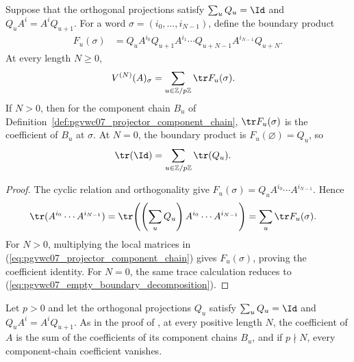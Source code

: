 \begin{lemma}
    \label{thm:pgvwc07_boundary_trace_coefficients}
    \leanok
    Suppose that the orthogonal projections satisfy
    $\sum_uQ_u=\Id$ and $Q_uA^i=A^iQ_{u+1}$. For a word
    $\sigma=(i_0,\ldots,i_{N-1})$, define the boundary product
    \begin{align}
        F_u(\sigma)
         & =Q_uA^{i_0}Q_{u+1}A^{i_1}\cdots
        Q_{u+N-1}A^{i_{N-1}}Q_{u+N}.
        \label{eq:pgvwc07_boundary_product}
    \end{align}
    At every length $N\geq 0$,
    \begin{align}
        V^{(N)}(A)_\sigma
         & =\sum_{u\in\mathbb Z/p\mathbb Z}\tr F_u(\sigma).
        \label{eq:pgvwc07_boundary_coefficient_decomposition}
    \end{align}
    If $N>0$, then for the component chain $B_u$ of
    Definition~\ref{def:pgvwc07_projector_component_chain}, $\tr F_u(\sigma)$
    is the coefficient of $B_u$ at $\sigma$.
    At $N=0$, the boundary product is $F_u(\varnothing)=Q_u$, so
    \begin{align}
        \tr(\Id)
         & =\sum_{u\in\mathbb Z/p\mathbb Z}\tr(Q_u).
        \label{eq:pgvwc07_empty_boundary_decomposition}
    \end{align}
\end{lemma}

\begin{proof}
    \leanok
    The cyclic relation and orthogonality give
    $F_u(\sigma)=Q_uA^{i_0}\cdots A^{i_{N-1}}$. Hence
    \begin{align}
        \tr(A^{i_0}\cdots A^{i_{N-1}})
         & =\tr\!\left(\left(\sum_uQ_u\right)
        A^{i_0}\cdots A^{i_{N-1}}\right)
        =\sum_u\tr F_u(\sigma).
    \end{align}
    For $N>0$, multiplying the local matrices in
    (\ref{eq:pgvwc07_projector_component_chain}) gives
    $F_u(\sigma)$, proving the coefficient identity. For $N=0$, the same trace
    calculation reduces to (\ref{eq:pgvwc07_empty_boundary_decomposition}).
\end{proof}

\begin{lemma}
    \label{thm:pgvwc07_component_sum_and_vanishing}
    \leanok
    Let $p>0$ and let the orthogonal projections $Q_u$ satisfy
    $\sum_uQ_u=\Id$ and $Q_uA^i=A^iQ_{u+1}$. As in the proof of
    \cite[Theorem~5]{PerezGarcia2007Matrix}, at every positive length $N$,
    the coefficient of $A$ is the sum of the coefficients of its component
    chains $B_u$, and if $p\nmid N$, every component-chain coefficient vanishes.
\end{lemma}


